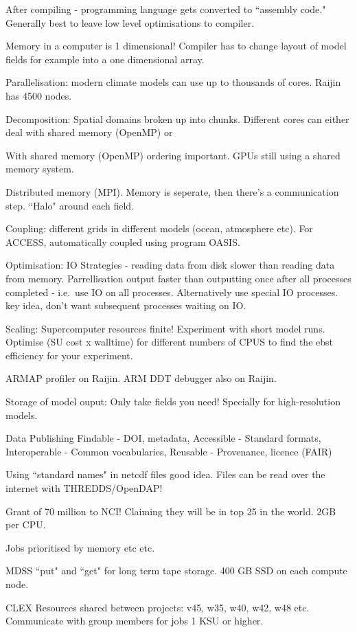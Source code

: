 \documentclass[12pt]{article}
\begin{document}
After compiling - programming language gets converted to ``assembly code." Generally best to leave low level optimisations to compiler. 

Memory in a computer is 1 dimensional! Compiler has to change layout of model fields for example into a one dimensional array.

Parallelisation: modern climate models can use up to thousands of cores. Raijin has 4500 nodes. 

Decomposition: Spatial domains broken up into chunks. Different cores can either deal with shared memory (OpenMP) or 

With shared memory (OpenMP) ordering important. GPUs still using a shared memory system. 

Distributed memory (MPI). Memory is seperate, then there's a communication step. ``Halo" around each field. 

Coupling: different grids in different models (ocean, atmosphere etc). For ACCESS, automatically coupled using program OASIS. 

Optimisation: IO Strategies - reading data from disk slower than reading data from memory. Parrellisation output faster than outputting once after all processes completed - i.e.~use IO on all processes. Alternatively use special IO processes. key idea, don't want subsequent processes waiting on IO.

Scaling: Supercomputer resources finite! Experiment with short model runs. Optimise (SU cost x walltime) for different numbers of CPUS to find the ebst efficiency for your experiment. 

ARMAP profiler on Raijin. ARM DDT debugger also on Raijin.  

Storage of model ouput: Only take fields you need! Specially for high-resolution models.

Data Publishing
Findable - DOI, metadata,
Accessible - Standard formats,
Interoperable - Common vocabularies,
Reusable - Provenance, licence
(FAIR)

Using ``standard names" in netcdf files good idea. Files can be read over the internet with THREDDS/OpenDAP!

Grant of 70 million to NCI! Claiming they will be in top 25 in the world. 2GB per CPU.

Jobs prioritised by memory etc etc.

MDSS ``put" and ``get" for long term tape storage. 400 GB SSD on each compute node. 

CLEX Resources shared between projects: v45, w35, w40, w42, w48 etc. Communicate with group members for jobs 1 KSU or higher. 
\end{document}
